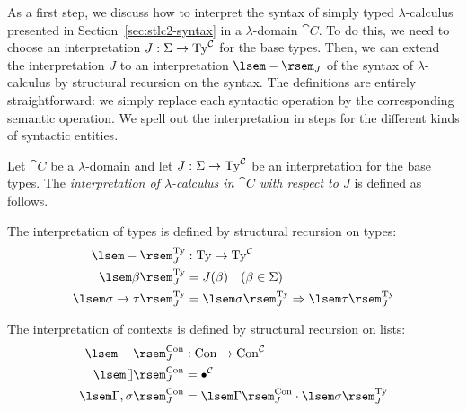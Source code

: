 
As a first step, we discuss how to interpret the syntax of simply typed $\lambda$-calculus presented in Section~\ref{sec:stlc2-syntax} in a $\lambda$-domain $\cat{C}$. To do this, we need to choose an interpretation $J : \Basetypes \to \STy[\cat{C}]$ for the base types. Then, we can extend the interpretation $J$ to an interpretation $\cint[J]{-}$ of the syntax of $\lambda$-calculus by structural recursion on the syntax. The definitions are entirely straightforward: we simply replace each syntactic operation by the corresponding semantic operation. We spell out the interpretation in steps for the different kinds of syntactic entities.

\begin{defn} \label{def:stlc2-int}
Let $\cat{C}$ be a $\lambda$-domain and let $J : \Basetypes \to \STy[\cat{C}]$ be an interpretation for the base types. The \emph{interpretation of $\lambda$-calculus in $\cat{C}$ with respect to $J$} is defined as follows.
\begin{enum}
\item The interpretation of types is defined by structural recursion on types:
\begin{align*}
\cintty[J]{-} &: \sTy \to \STy[\cat{C}] \\
\cintty[J]{\beta} &= J(\beta) \quad(\beta \in \Basetypes) \\
\cintty[J]{\functy{\sigma}{\tau}} &= \Sfuncty{\cintty[J]{\sigma}}{\cintty[J]{\tau}}
\end{align*}

\item The interpretation of contexts is defined by structural recursion on lists:
\begin{align*}
\cintcon[J]{-} &: \sCon \to \SCon[\cat{C}] \\
\cintcon[J]{\sempcon} &= \Sempcon[\cat{C}] \\
\cintcon[J]{\sextcon{\Gamma}{\sigma}}
    &= \Sextcon{\cintcon[J]{\Gamma}}{\cintty[J]{\sigma}}
\end{align*}


\end{enum}
\end{defn}
